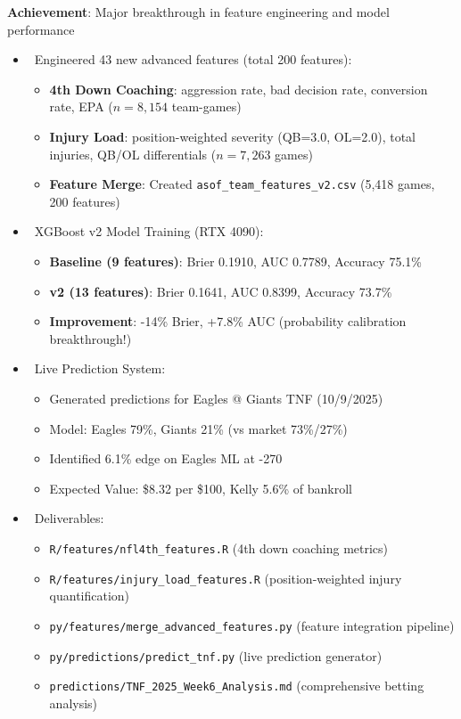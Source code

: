 
\textbf{Achievement}: Major breakthrough in feature engineering and model performance
\begin{itemize}
  \item \done\ Engineered 43 new advanced features (total 200 features):
  \begin{itemize}
    \item \textbf{4th Down Coaching}: aggression rate, bad decision rate, conversion rate, EPA ($n=8,154$ team-games)
    \item \textbf{Injury Load}: position-weighted severity (QB=3.0, OL=2.0), total injuries, QB/OL differentials ($n=7,263$ games)
    \item \textbf{Feature Merge}: Created \texttt{asof\_team\_features\_v2.csv} (5,418 games, 200 features)
  \end{itemize}
  \item \done\ XGBoost v2 Model Training (RTX 4090):
  \begin{itemize}
    \item \textbf{Baseline (9 features)}: Brier 0.1910, AUC 0.7789, Accuracy 75.1\%
    \item \textbf{v2 (13 features)}: Brier 0.1641, AUC 0.8399, Accuracy 73.7\%
    \item \textbf{Improvement}: -14\% Brier, +7.8\% AUC (probability calibration breakthrough!)
  \end{itemize}
  \item \done\ Live Prediction System:
  \begin{itemize}
    \item Generated predictions for Eagles @ Giants TNF (10/9/2025)
    \item Model: Eagles 79\%, Giants 21\% (vs market 73\%/27\%)
    \item Identified 6.1\% edge on Eagles ML at -270
    \item Expected Value: \$8.32 per \$100, Kelly 5.6\% of bankroll
  \end{itemize}
  \item \done\ Deliverables:
  \begin{itemize}
    \item \texttt{R/features/nfl4th\_features.R} (4th down coaching metrics)
    \item \texttt{R/features/injury\_load\_features.R} (position-weighted injury quantification)
    \item \texttt{py/features/merge\_advanced\_features.py} (feature integration pipeline)
    \item \texttt{py/predictions/predict\_tnf.py} (live prediction generator)
    \item \texttt{predictions/TNF\_2025\_Week6\_Analysis.md} (comprehensive betting analysis)
  \end{itemize}
\end{itemize}

